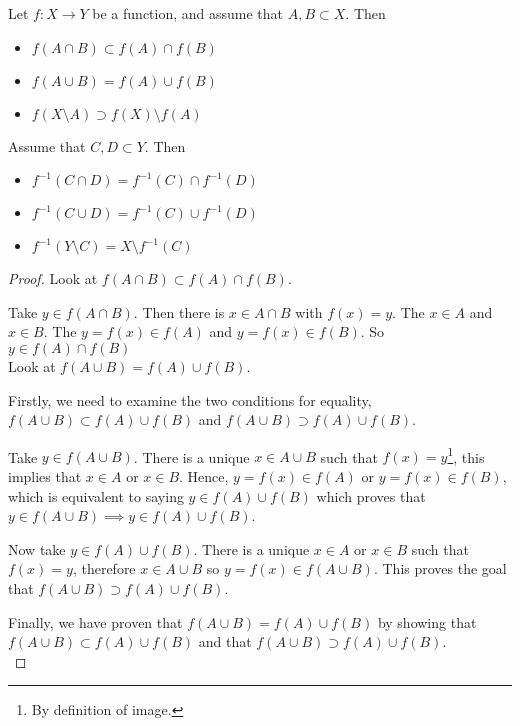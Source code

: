 \documentclass[10pt, a4paper]{article}
\begin{document}
\begin{proposition}
    Let $f : X \to Y$ be a function, and assume that $A, B \subset X$. Then
    \begin{itemize}
        \item $f(A \cap B) \subset f(A) \cap f(B)$
        \item $f(A \cup B) = f(A) \cup f(B)$
        \item $f(X \setminus A) \supset f(X) \setminus f(A)$
    \end{itemize}
    Assume that $C, D \subset Y$. Then
    \begin{itemize}
        \item $f ^ {-1}(C \cap D) = f^{-1}(C) \cap f^{-1}(D)$
        \item $f^{-1}(C \cup D) = f^{-1}(C) \cup f^{-1}(D)$
        \item $f^{-1}(Y \setminus C) = X \setminus f^{-1}(C)$
    \end{itemize}

    \begin{proof}
        Look at $f(A \cap B) \subset f(A) \cap f(B)$.
        
        Take $y \in f(A \cap B)$. Then there is $x \in A \cap B$ with $f(x) = y$.
        The $x \in A$ and $x \in B$. The $y = f(x) \in f(A)$ and $y = f(x) \in f(B)$.
        So $y \in f(A) \cap f(B)$ \\

        Look at $f(A \cup B) = f(A) \cup f(B)$.

        Firstly, we need to examine the two conditions for equality, $f(A \cup B) \subset f(A) \cup f(B)$ and $f(A \cup B) \supset f(A) \cup f(B)$.
        
        Take $y \in f(A \cup B)$. There is a unique $x \in A \cup B$ such that $f(x) = y$\footnote{By definition of image.}, this implies that $x \in A$ or $x \in B$. Hence, $y = f(x) \in f(A)$ or $y = f(x) \in f(B)$, which is equivalent to saying $y \in f(A) \cup f(B)$ which proves that $y \in f(A \cup B) \implies y \in f(A) \cup f(B)$.

        Now take $y \in f(A) \cup f(B)$. There is a unique $x \in A$ or $x \in B$ such that $f(x) = y$, therefore $x \in A \cup B$ so $y = f(x) \in f(A \cup B)$. This proves the goal that $f(A \cup B) \supset f(A) \cup f(B)$.

        Finally, we have proven that $f(A \cup B) = f(A) \cup f(B)$ by showing that $f(A \cup B) \subset f(A) \cup f(B)$ and that $f(A \cup B) \supset f(A) \cup f(B)$. \\


\end{proof}
\end{proposition}
\end{document}
